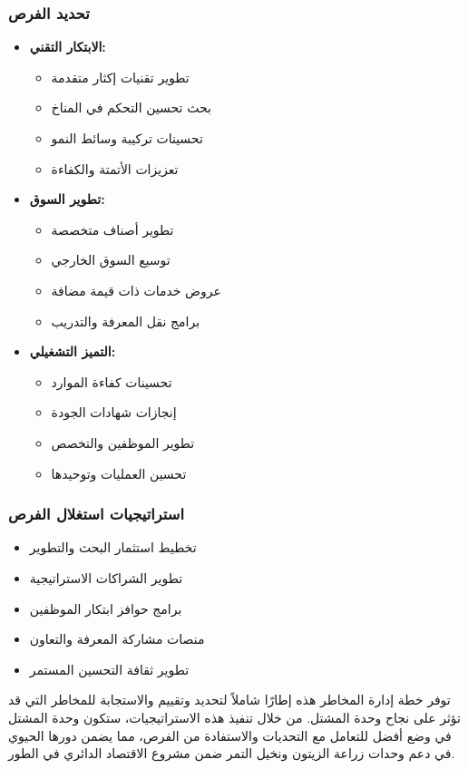 \subsubsection{تحديد الفرص}
\begin{itemize}
    \item \textbf{الابتكار التقني:}
    \begin{itemize}
        \item تطوير تقنيات إكثار متقدمة
        \item بحث تحسين التحكم في المناخ
        \item تحسينات تركيبة وسائط النمو
        \item تعزيزات الأتمتة والكفاءة
    \end{itemize}
    
    \item \textbf{تطوير السوق:}
    \begin{itemize}
        \item تطوير أصناف متخصصة
        \item توسيع السوق الخارجي
        \item عروض خدمات ذات قيمة مضافة
        \item برامج نقل المعرفة والتدريب
    \end{itemize}
    
    \item \textbf{التميز التشغيلي:}
    \begin{itemize}
        \item تحسينات كفاءة الموارد
        \item إنجازات شهادات الجودة
        \item تطوير الموظفين والتخصص
        \item تحسين العمليات وتوحيدها
    \end{itemize}
\end{itemize}

\subsubsection{استراتيجيات استغلال الفرص}
\begin{itemize}
    \item تخطيط استثمار البحث والتطوير
    \item تطوير الشراكات الاستراتيجية
    \item برامج حوافز ابتكار الموظفين
    \item منصات مشاركة المعرفة والتعاون
    \item تطوير ثقافة التحسين المستمر
\end{itemize}

توفر خطة إدارة المخاطر هذه إطارًا شاملاً لتحديد وتقييم والاستجابة للمخاطر التي قد تؤثر على نجاح وحدة المشتل. من خلال تنفيذ هذه الاستراتيجيات، ستكون وحدة المشتل في وضع أفضل للتعامل مع التحديات والاستفادة من الفرص، مما يضمن دورها الحيوي في دعم وحدات زراعة الزيتون ونخيل التمر ضمن مشروع الاقتصاد الدائري في الطور. 